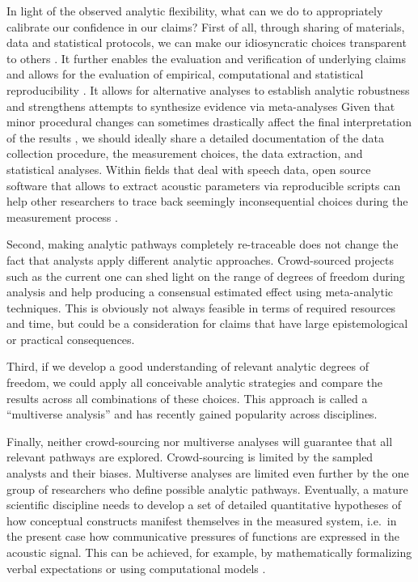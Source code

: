 \documentclass[Review,times,sageh]{sagej}
\begin{document}
In light of the observed analytic flexibility, what can we do to appropriately calibrate our confidence in our claims?
First of all, through sharing of materials, data and statistical protocols, we can make our idiosyncratic choices transparent to others \citep{munafo2017manifesto, vazire2017quality}.
It further enables the evaluation and verification of underlying claims and allows for the evaluation of empirical, computational and statistical reproducibility \citep{lebel2018unified}.
It allows for alternative analyses to establish analytic robustness \citep{steegen2016increasing} and strengthens attempts to synthesize evidence via meta-analyses \citep[e.g.,][]{nicenboim2018using}
Given that minor procedural changes can sometimes drastically affect the final interpretation of the results \citep{breznau2021observing}, we should ideally share a detailed documentation of the data collection procedure, the measurement choices, the data extraction, and statistical analyses.
Within fields that deal with speech data, open source software that allows to extract acoustic parameters via reproducible scripts can help other researchers to trace back seemingly inconsequential choices during the measurement process \citep[e.g., Praat:][EMU: \citet{winkelmann2017emu}, the Montreal Forced Aligner \citet{mcauliffe2017},]{boersma2021praat}.

Second, making analytic pathways completely re-traceable does not change the fact that analysts apply different analytic approaches.
Crowd-sourced projects such as the current one can shed light on the range of degrees of freedom during analysis and help producing a consensual estimated effect using meta-analytic techniques.
This is obviously not always feasible in terms of required resources and time, but could be a consideration for claims that have large epistemological or practical consequences.

Third, if we develop a good understanding of relevant analytic degrees of freedom, we could apply all conceivable analytic strategies and compare the results across all combinations of these choices.
This approach is called a ``multiverse analysis'' \citep[e.g,][]{steegen2016increasing, harder2020multiverse} and has recently gained popularity across disciplines.

Finally, neither crowd-sourcing nor multiverse analyses will guarantee that all relevant pathways are explored.
Crowd-sourcing is limited by the sampled analysts and their biases.
Multiverse analyses are limited even further by the one group of researchers who define possible analytic pathways.
Eventually, a mature scientific discipline needs to develop a set of detailed quantitative hypotheses of how conceptual constructs manifest themselves in the measured system, i.e.~in the present case how communicative pressures of functions are expressed in the acoustic signal.
This can be achieved, for example, by mathematically formalizing verbal expectations or using computational models \citep[e.g.,][]{van2020formalizing, guest2021computational, scheel2021hypothesis, devezer2021case}.
\end{document}
